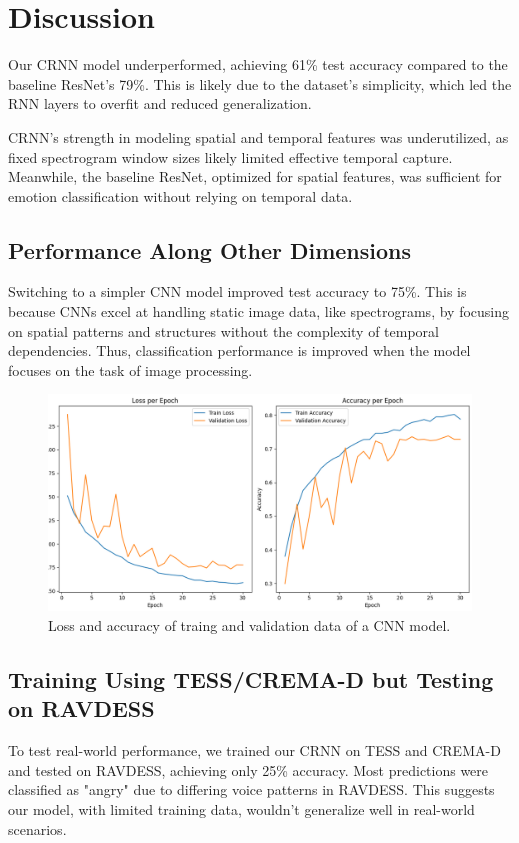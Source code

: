 \documentclass[../main.tex]{subfiles}
\begin{document}
\section{Discussion}

Our CRNN model underperformed, achieving 61\% test accuracy compared to the 
baseline ResNet's 79\%. This is likely due to the dataset's simplicity, which 
led the RNN layers to overfit and reduced generalization.

CRNN's strength in modeling spatial and temporal features was underutilized, as 
fixed spectrogram window sizes likely limited effective temporal capture. 
Meanwhile, the baseline ResNet, optimized for spatial features, was sufficient for 
emotion classification without relying on temporal data.

\subsection{Performance Along Other Dimensions}

Switching to a simpler CNN model improved test accuracy to 75\%. This is because 
CNNs excel at handling static image data, like spectrograms, by focusing on 
spatial patterns and structures without the complexity of temporal dependencies. Thus, 
classification performance is improved when the model focuses on the task of 
image processing.

\begin{figure}[h]
    \centering
    \includegraphics[width=.5\linewidth]{../resources/cnn_mixed.png}
    \caption{Loss and accuracy of traing and validation data of a CNN model.}
    \label{fig:cnn_mixed}
\end{figure}

\subsection{Training Using TESS/CREMA-D but Testing on RAVDESS}

To test real-world performance, we trained our CRNN on TESS and CREMA-D 
and tested on RAVDESS, achieving only 25\% accuracy. Most predictions were 
classified as "angry" due to differing voice patterns in RAVDESS. This 
suggests our model, with limited training data, wouldn't generalize well 
in real-world scenarios.
\end{document}
